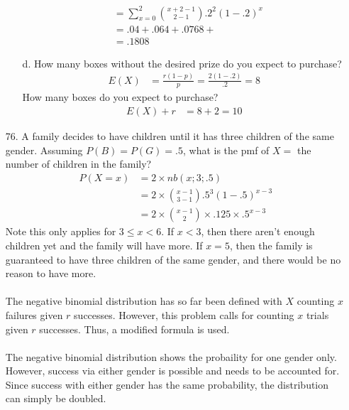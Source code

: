 \documentclass[letterpaper,12pt]{article}
\newcommand{\nb}[3]{%
  \binom{#1 + #2 - 1}{#2 - 1}{#3}^{#2}(1 - #3)^{#1}%
}
\begin{document}
\begin{enumerate}
\begin{enumerate}
\begin{align*}
          &= \sum_{x = 0}^{2} \nb{x}{2}{.2} \\
          &= .04 + .064 + .0768 + \\
          &= .1808
        \end{align*}
      \item[d.]
        How many boxes without the desired prize do you expect to purchase?
        \begin{align*}
          E(X) &= \frac{r(1 - p)}{p} = \frac{2(1 - .2)}{.2} = 8
        \end{align*}
        How many boxes do you expect to purchase?
        \begin{align*}
          E(X) + r &= 8 + 2 = 10
        \end{align*}
    \end{enumerate}
  \item[76.]
    A family decides to have children until it has three children of the same gender. Assuming $P(B) = P(G) = .5$, what is the pmf of $X =$ the number of children in the family?
    \begin{align*}
      P(X = x) &= 2 \times nb(x; 3; .5) \\
      &= 2 \times \binom{x - 1}{3 - 1}.5^3(1 - .5)^{x - 3} \\
      &= 2 \times \binom{x - 1}{2} \times .125 \times .5^{x - 3}
    \end{align*}
    Note this only applies for $3 \le x < 6$. If $x < 3$, then there aren't enough children yet and the family will have more. If $x = 5$, then the family is guaranteed to have three children of the same gender, and there would be no reason to have more. \\ \\
    The negative binomial distribution has so far been defined with $X$ counting $x$ failures given $r$ successes. However, this problem calls for counting $x$ trials given $r$ successes. Thus, a modified formula is used. \\ \\
    The negative binomial distribution shows the probaility for one gender only. However, success via either gender is possible and needs to be accounted for. Since success with either gender has the same probability, the distribution can simply be doubled.
  \end{enumerate}
\end{document}
